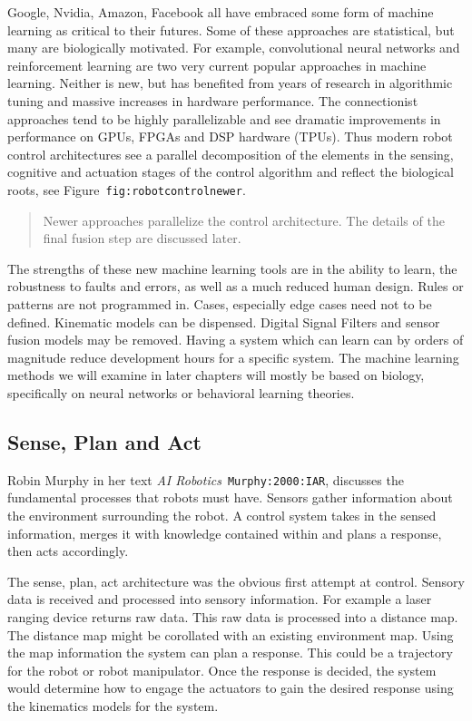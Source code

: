 Google, Nvidia, Amazon, Facebook all have embraced some form of machine
learning as critical to their futures. Some of these approaches are
statistical, but many are biologically motivated. For example,
convolutional neural networks and reinforcement learning are two very
current popular approaches in machine learning. Neither is new, but has
benefited from years of research in algorithmic tuning and massive
increases in hardware performance. The connectionist approaches tend to
be highly parallelizable and see dramatic improvements in performance on
GPUs, FPGAs and DSP hardware (TPUs). Thus modern robot control
architectures see a parallel decomposition of the elements in the
sensing, cognitive and actuation stages of the control algorithm and
reflect the biological roots, see Figure~\texttt{fig:robotcontrolnewer}.

\begin{quote}
Newer approaches parallelize the control architecture. The details of
the final fusion step are discussed later.
\end{quote}

The strengths of these new machine learning tools are in the ability to
learn, the robustness to faults and errors, as well as a much reduced
human design. Rules or patterns are not programmed in. Cases, especially
edge cases need not to be defined. Kinematic models can be dispensed.
Digital Signal Filters and sensor fusion models may be removed. Having a
system which can learn can by orders of magnitude reduce development
hours for a specific system. The machine learning methods we will
examine in later chapters will mostly be based on biology, specifically
on neural networks or behavioral learning theories.

\hypertarget{sense-plan-and-act}{%
\subsection{Sense, Plan and Act}\label{sense-plan-and-act}}

Robin Murphy in her text \emph{AI Robotics}~\texttt{Murphy:2000:IAR},
discusses the fundamental processes that robots must have. Sensors
gather information about the environment surrounding the robot. A
control system takes in the sensed information, merges it with knowledge
contained within and plans a response, then acts accordingly.

The sense, plan, act architecture was the obvious first attempt at
control. Sensory data is received and processed into sensory
information. For example a laser ranging device returns raw data. This
raw data is processed into a distance map. The distance map might be
corollated with an existing environment map. Using the map information
the system can plan a response. This could be a trajectory for the robot
or robot manipulator. Once the response is decided, the system would
determine how to engage the actuators to gain the desired response using
the kinematics models for the system.

